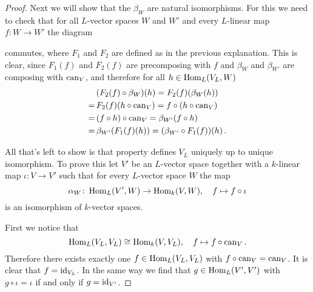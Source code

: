 \begin{proof}
  Next we will show that the $\beta_W$ are natural isomorphisms.
  For this we need to check that for all $L$-vector spaces $W$ and $W'$ and every $L$-linear map \mbox{$f \colon W \to W'$} the diagram
  \begin{center}
  \end{center}
  commutes, where $F_1$ and $F_2$ are defined as in the previous explanation.
  This is clear, since $F_1(f)$ and $F_2(f)$ are precomposing with $f$ and $\beta_W$ and $\beta_{W'}$ are composing with $\operatorname{can}_V$, and therefore for all $h \in \operatorname{Hom}_L(V_L, W)$
  \begin{align*}
     &\,  (F_2(f) \circ \beta_W)(h)
    =     F_2(f)(\beta_W(h)) \\
    =&\,  F_2(f)(h \circ \operatorname{can}_V)
    =     f \circ (h \circ \operatorname{can}_V) \\
    =&\,  (f \circ h) \circ \operatorname{can}_V
    =     \beta_{W'}(f \circ h) \\
    =&\,  \beta_{W'}(F_1(f)(h))
    =     (\beta_{W'} \circ F_1(f))(h) \,.
  \end{align*}
  
  All that’s left to show is that property defines $V_L$ uniquely up to unique isomorphism.
  To prove this let $V'$ be an $L$-vector space together with a $k$-linear map $\iota \colon V \to V'$ such that for every $L$-vector space $W$ the map
  \[
            \alpha_W
    \colon  \operatorname{Hom}_L(V', W)
    \to     \operatorname{Hom}_k(V, W),
    \quad   f
    \mapsto f \circ \iota
  \]
  is an isomorphism of $k$-vector spaces.
  
  First we notice that
  \[
            \operatorname{Hom}_L(V_L, V_L)
    \cong   \operatorname{Hom}_k(V, V_L),
    \quad   f
    \mapsto f \circ \operatorname{can}_V.
  \]
  Therefore there exists exactly one $f \in \operatorname{Hom}_L(V_L, V_L)$ with $f \circ \operatorname{can}_V = \operatorname{can}_V$.
  It is clear that $f = \operatorname{id}_{V_L}$.
  In the same way we find that $g \in \operatorname{Hom}_L(V', V')$ with $g \circ \iota = \iota$ if and only if $g = \operatorname{id}_{V'}$.
  

\end{proof}
